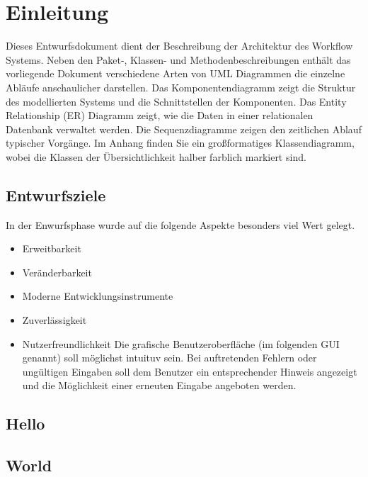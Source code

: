 \chapter{Einleitung}
    Dieses Entwurfsdokument dient der Beschreibung der Architektur des Workflow Systems.
    Neben den Paket-, Klassen- und Methodenbeschreibungen enthält das vorliegende Dokument verschiedene Arten von UML %
    Diagrammen die einzelne Abläufe anschaulicher darstellen. \newline
    Das Komponentendiagramm zeigt die Struktur des modellierten Systems und die Schnittstellen der Komponenten. \newline
    Das Entity Relationship (ER) Diagramm zeigt, wie die Daten in einer relationalen Datenbank verwaltet werden.\newline
    Die Sequenzdiagramme zeigen den zeitlichen Ablauf typischer Vorgänge.\newline 
    Im Anhang finden Sie ein großformatiges Klassendiagramm, wobei die Klassen der Übersichtlichkeit halber farblich markiert sind.
    \newline
    \section{Entwurfsziele}
    In der Enwurfsphase wurde auf die folgende Aspekte besonders viel Wert gelegt. 
        \begin{itemize}
            \item Erweitbarkeit
                
            \item Veränderbarkeit
            \item Moderne Entwicklungsinstrumente
            \item Zuverlässigkeit
            \item Nutzerfreundlichkeit \newline
                Die grafische Benutzeroberfläche (im folgenden GUI genannt) soll möglichst intuituv sein. Bei auftretenden Fehlern oder ungültigen Eingaben soll dem Benutzer ein entsprechender Hinweis angezeigt und die Möglichkeit einer erneuten Eingabe angeboten werden.
        \end{itemize}
    \section{Hello}
        \lipsum[20]
        
    \section{World}
        \lipsum[21]
        

